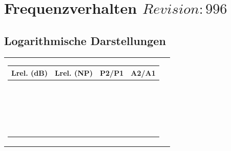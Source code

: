 \section{Frequenzverhalten \tiny{$Revision: 996 $}}
\subsection{Logarithmische Darstellungen}
\begin{tabular}{ll}
\parbox{7cm}{
	\scriptsize
	\begin{tabular}{|c|c|c|c|}
	\hline
	\textbf{Lrel. (dB)} & \textbf{Lrel. (NP)} & \textbf{P2/P1} & \textbf{A2/A1} \\ \hline
	$100.000$ & $11.513$ & $10^{10}$ & $10^5$ \\ \hline
	$90.000$ & $10.362$ & $10^9$ & $31622.777$ \\ \hline
	$80.000$ & $9.210$ & $10^8$ & $10^4$ \\ \hline
	$70.000$ & $8.059$ & $10^7$ & $3162.278$ \\ \hline
	$60.000$ & $6.908$ & $10^6$ & $10^3$ \\ \hline
	$50.000$ & $5.756$ & $10^5$ & $316.228$ \\ \hline
	$40.000$ & $4.605$ & $10^4$ & $10^2$ \\ \hline
	$30.000$ & $3.454$ & $10^3$ & $31.623$ \\ \hline
	\textbf{$20.000$} & $2.303$ & \textbf{$10^2$} & \textbf{$10.000$} \\ \hline
	$19.085$ & $2.197$ & $81.000$ & $9.000$ \\ \hline
	$19.000$ & $2.187$ & $79.433$ & $8.913$ \\ \hline
	$18.062$ & $2.079$ & $64.000$ & $8.000$ \\ \hline
	$18.000$ & $2.072$ & $63.096$ & $7.943$ \\ \hline
	$17.000$ & $1.957$ & $50.119$ & $7.079$ \\ \hline
	$16.902$ & $1.946$ & $49.000$ & $7.000$ \\ \hline
	$16.000$ & $1.842$ & $39.811$ & $6.310$ \\ \hline
	$15.563$ & $1.792$ & $36.000$ & $6.000$ \\ \hline
	$15.000$ & $1.727$ & $31.623$ & $5.623$ \\ \hline
	$14.000$ & $1.612$ & $25.119$ & $5.012$ \\ \hline
	\textbf{$13.979$} & $1.609$ & \textbf{$25.000$} & \textbf{$5.000$} \\ \hline
	$13.000$ & $1.497$ & $19.953$ & $4.467$ \\ \hline

\end{tabular}}
\end{tabular}
